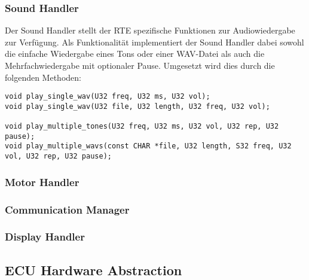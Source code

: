 


\subsubsection{Sound Handler}

Der Sound Handler stellt der RTE spezifische Funktionen zur Audiowiedergabe zur Verfügung.  
Als Funktionalität implementiert der Sound Handler dabei sowohl die einfache Wiedergabe eines Tons oder einer WAV-Datei als auch die Mehrfachwiedergabe mit optionaler Pause. Umgesetzt wird dies durch die folgenden Methoden:

\begin{lstlisting}[frame=single]  
void play_single_wav(U32 freq, U32 ms, U32 vol);
void play_single_wav(U32 file, U32 length, U32 freq, U32 vol);

void play_multiple_tones(U32 freq, U32 ms, U32 vol, U32 rep, U32 pause);
void play_multiple_wavs(const CHAR *file, U32 length, S32 freq, U32 vol, U32 rep, U32 pause);
\end{lstlisting}


\subsubsection{Motor Handler}


\subsubsection{Communication Manager}


\subsubsection{Display Handler}


\subsection{ECU Hardware Abstraction}

